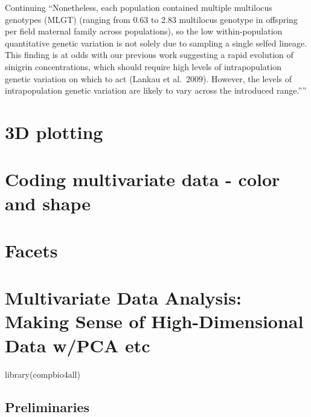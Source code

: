 \documentclass[
]{book}
\newenvironment{Shaded}{\begin{snugshade}}{\end{snugshade}}
\newcommand{\FunctionTok}[1]{\textcolor[rgb]{0.00,0.00,0.00}{#1}}
\newcommand{\NormalTok}[1]{#1}
\begin{document}
Continuing
``Nonetheless, each population contained multiple multilocus genotypes (MLGT) (ranging from 0.63 to 2.83 multilocus genotype in offspring per field maternal family across populations), so the low within-population quantitative genetic variation
is not solely due to sampling a single selfed lineage.
This finding is at odds with our previous work suggesting a rapid evolution of sinigrin concentrations, which should require high levels of intrapopulation genetic variation on which to act (Lankau et al.~2009). However, the levels of intrapopulation genetic variation are likely to vary across the introduced range.''''

\hypertarget{d-plotting}{%
\chapter{3D plotting}\label{d-plotting}}

\hypertarget{coding-multivariate-data---color-and-shape}{%
\chapter{Coding multivariate data - color and shape}\label{coding-multivariate-data---color-and-shape}}

\hypertarget{facets}{%
\chapter{Facets}\label{facets}}

\hypertarget{multivariate-data-analysis-making-sense-of-high-dimensional-data-wpca-etc}{%
\chapter{Multivariate Data Analysis: Making Sense of High-Dimensional Data w/PCA etc}\label{multivariate-data-analysis-making-sense-of-high-dimensional-data-wpca-etc}}

\begin{Shaded}
\begin{Highlighting}[]
\FunctionTok{library}\NormalTok{(compbio4all)}
\end{Highlighting}
\end{Shaded}

\hypertarget{preliminaries-14}{%
\section{Preliminaries}\label{preliminaries-14}}
\end{document}
